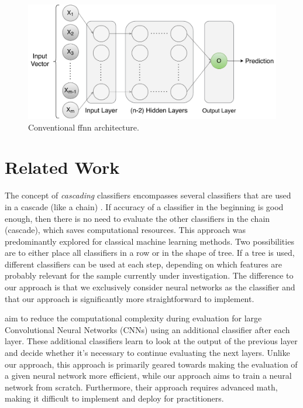 \documentclass[conference]{IEEEtran}
\begin{document}
 \begin{figure}
  \includegraphics[width=\linewidth]{figures/ffnn_new.pdf}
  \caption{Conventional \gls{ffnn} architecture.}
  \label{fig:ffnn}
\end{figure}

\section{Related Work}

The concept of \textit{cascading} classifiers encompasses several classifiers that are used in a cascade (like a chain) \cite{viola_robust_2004, xu_classifier_2014, wang_efficient_2015}. If accuracy of a classifier in the beginning is good enough, then there is no need to evaluate the other classifiers in the chain (cascade), which saves computational resources. This approach was predominantly explored for classical machine learning methods. Two possibilities are to either place all classifiers in a row or in the shape of tree. If a tree is used, different classifiers can be used at each step, depending on which features are probably relevant for the sample currently under investigation. The difference to our approach is that we exclusively consider neural networks as the classifier and that our approach is significantly more straightforward to implement.

\cite{bolukbasi_adaptive_2017} aim to reduce the computational complexity during evaluation for large Convolutional Neural Networks (CNNs) using an additional classifier after each layer. These additional classifiers learn to look at the output of the previous layer and decide whether it's necessary to continue evaluating the next layers. Unlike our approach, this approach is primarily geared towards making the evaluation of a given neural network more efficient, while our approach aims to train a neural network from scratch. Furthermore, their approach requires advanced math, making it difficult to implement and deploy for practitioners.
\end{document}
